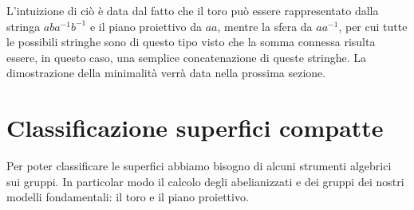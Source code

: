 L'intuizione di ciò è data dal fatto che il toro può essere rappresentato dalla stringa $aba^{-1}b^{-1}$ e il piano proiettivo da $aa$, mentre la sfera da $aa^{-1}$, per cui tutte le possibili stringhe sono di questo tipo visto che la somma connessa risulta essere, in questo caso, una semplice concatenazione di queste stringhe. La dimostrazione della minimalità verrà data nella prossima sezione.


\section{Classificazione superfici compatte}

Per poter classificare le superfici abbiamo bisogno di alcuni strumenti algebrici sui gruppi. In particolar modo il calcolo degli abelianizzati e dei gruppi dei nostri modelli fondamentali: il toro e il piano proiettivo.

